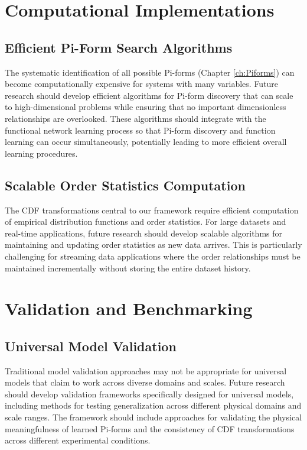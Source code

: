 \section{Computational Implementations}
\subsection{Efficient Pi-Form Search Algorithms}
The systematic identification of all possible Pi-forms (Chapter \ref{ch:Piforms}) can become computationally expensive for systems with many variables. Future research should develop efficient algorithms for Pi-form discovery that can scale to high-dimensional problems while ensuring that no important dimensionless relationships are overlooked.
These algorithms should integrate with the functional network learning process so that Pi-form discovery and function learning can occur simultaneously, potentially leading to more efficient overall learning procedures.

\subsection{Scalable Order Statistics Computation}
The CDF transformations central to our framework require efficient computation of empirical distribution functions and order statistics. For large datasets and real-time applications, future research should develop scalable algorithms for maintaining and updating order statistics as new data arrives.
This is particularly challenging for streaming data applications where the order relationships must be maintained incrementally without storing the entire dataset history.

\section{Validation and Benchmarking}
\subsection{Universal Model Validation}
Traditional model validation approaches may not be appropriate for universal models that claim to work across diverse domains and scales. Future research should develop validation frameworks specifically designed for universal models, including methods for testing generalization across different physical domains and scale ranges.
The framework should include approaches for validating the physical meaningfulness of learned Pi-forms and the consistency of CDF transformations across different experimental conditions.

